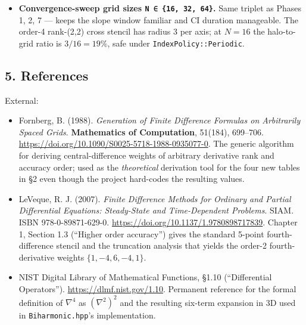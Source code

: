 \begin{itemize}
  Phase 8 ships eight new specializations totaling \textasciitilde30 LOC
  of weights. Fornberg becomes worth its weight when a phase needs
  orders \(\geq 6\) or many ranks at once; that decision moves to Phase
  11 (up-to-4th-order gradient) at the earliest. Audit of the hard-coded
  values is delegated to \passthrough{\lstinline!EXPECT\_DOUBLE\_EQ!}
  against published Fornberg-derived references in the test suite.
\item
  \textbf{Convergence-sweep grid sizes
  \passthrough{\lstinline!N ∈ \{16, 32, 64\}!}.} Same triplet as Phases
  1, 2, 7 --- keeps the slope window familiar and CI duration
  manageable. The order-4 rank-(2,2) cross stencil has radius 3 per
  axis; at \(N = 16\) the halo-to-grid ratio is \(3/16 = 19\%\), safe
  under \passthrough{\lstinline!IndexPolicy::Periodic!}.
\end{itemize}

\subsection{5. References}\label{references}

External:

\begin{itemize}
\tightlist
\item
  Fornberg, B. (1988). \emph{Generation of Finite Difference Formulas on
  Arbitrarily Spaced Grids}. \textbf{Mathematics of Computation},
  51(184), 699--706.
  \url{https://doi.org/10.1090/S0025-5718-1988-0935077-0}. The generic
  algorithm for deriving central-difference weights of arbitrary
  derivative rank and accuracy order; used as the \emph{theoretical}
  derivation tool for the four new tables in §2 even though the project
  hard-codes the resulting values.
\item
  LeVeque, R. J. (2007). \emph{Finite Difference Methods for Ordinary
  and Partial Differential Equations: Steady-State and Time-Dependent
  Problems}. SIAM. ISBN 978-0-89871-629-0.
  \url{https://doi.org/10.1137/1.9780898717839}. Chapter 1, Section 1.3
  (``Higher order accuracy'') gives the standard 5-point
  fourth-difference stencil and the truncation analysis that yields the
  order-2 fourth-derivative weights \(\{1, -4, 6, -4, 1\}\).
\item
  NIST Digital Library of Mathematical Functions, §1.10 (``Differential
  Operators''). \url{https://dlmf.nist.gov/1.10}. Permanent reference
  for the formal definition of \(\nabla^4\) as \((\nabla^2)^2\) and the
  resulting six-term expansion in 3D used in
  \passthrough{\lstinline!Biharmonic.hpp!}'s implementation.
\end{itemize}

